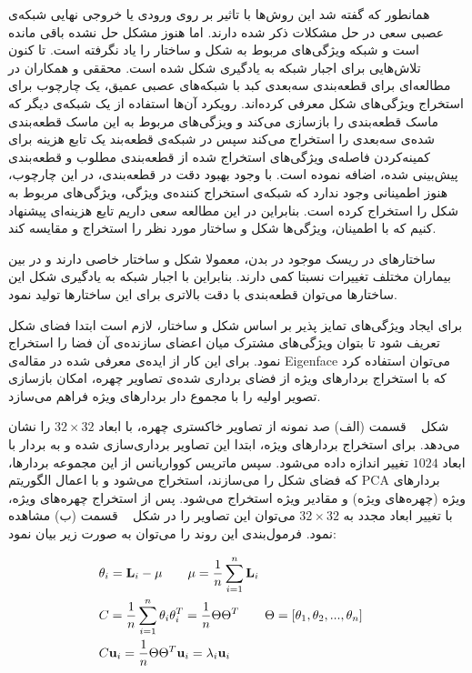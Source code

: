 همانطور که گفته شد این روش‌ها با تاثیر بر روی ورودی یا خروجی نهایی شبکه‌ی عصبی سعی در حل مشکلات ذکر شده دارند. اما هنوز مشکل حل نشده باقی مانده است و شبکه ویژگی‌های مربوط به شکل و ساختار را یاد نگرفته است. تا کنون تلاش‌هایی برای اجبار شبکه به یادگیری شکل شده است. محققی و همکاران  در مطالعه‌ای برای قطعه‌بندی سه‌بعدی کبد با شبکه‌های عصبی عمیق، یک چارچوب برای استخراج ویژگی‌های شکل معرفی کرده‌اند. رویکرد آن‌ها استفاده از یک شبکه‌ی دیگر که ماسک قطعه‌بندی را بازسازی می‌کند و ویزگی‌های مربوط به این ماسک قطعه‌بندی شده‌ی سه‌بعدی را استخراج می‌کند سپس در شبکه‌ی قطعه‌بند یک تابع هزینه برای کمینه‌کردن فاصله‌ی ویژگی‌های استخراج شده از قطعه‌بندی مطلوب و قطعه‌بندی پیش‌بینی شده، اضافه نموده است. با وجود بهبود دقت در قطعه‌بندی، در این چارچوب، هنوز اطمینانی وجود ندارد که شبکه‌ی استخراج کننده‌ی ویژگی، ویژگی‌های مربوط به شکل را استخراج کرده است. بنابراین در این مطالعه سعی داریم تایع هزینه‌ای پیشنهاد کنیم که با اطمینان، ویژگی‌ها شکل و ساختار مورد نظر را استخراج و مقایسه کند.

ساختارهای در ریسک موجود در بدن، معمولا شکل و ساختار خاصی دارند و در بین بیماران مختلف تغییرات نسبتا کمی دارند. بنابراین با اجبار شبکه به یادگیری شکل این ساختارها می‌توان قطعه‌بندی با دقت بالاتری برای این ساختارها تولید نمود. 


برای ایجاد ویژگی‌های تمایز پذیر بر اساس شکل و ساختار، لازم است ابتدا فضای شکل تعریف شود تا بتوان ویژگی‌های مشترک میان اعضای سازنده‌ی آن فضا را استخراج نمود. برای این کار از ایده‌ی معرفی شده در مقاله‌ی Eigenface  می‌توان استفاده کرد که با استخراج بردارهای ویژه از فضای برداری شده‌ی تصاویر چهره، امکان بازسازی تصویر اولیه را با مجموع ‌‌دار بردارهای ویژه فراهم می‌سازد. 

شکل ~ قسمت (الف) صد نمونه از تصاویر خاکستری چهره، با ابعاد $32\times32$ را نشان می‌دهد. برای استخراج بردارهای ویژه، ابتدا این تصاویر برداری‌سازی شده و به بردار با ابعاد $1024$ تغییر اندازه داده می‌شود. سپس ماتریس کوواریانس از این مجموعه بردارها، که فضای شکل  را می‌سازند، استخراج می‌شود و با اعمال الگوریتم PCA    بردارهای ویژه (چهره‌های ویژه) و مقادیر ویژه استخراج می‌شود. پس از استخراج چهره‌های ویژه، با تغییر ابعاد مجدد به $32\times32$ می‌توان این تصاویر را در شکل ~ قسمت (ب) مشاهده نمود. فرمول‌بندی این روند را می‌توان به صورت زیر بیان نمود:

\begin{alignat}{5}
	&\mathbf{\theta}_i =  \mathbf{L}_i - \mathbf{\mu} \qquad  \mathbf{\mu} = \frac{1}{n}\sum_{i=1}^{n} \mathbf{L}_i \notag && \\
	&C = \frac{1}{n}\sum_{i=1}^{n}\mathbf{\theta}_i\mathbf{\theta}_i^{T} = \frac{1}{n}\Theta\Theta^T \qquad   \Theta = [\theta_1, \theta_2, ..., \theta_n]\notag && \\
	&C\mathbf{u}_i = \frac{1}{n}\Theta\Theta^T\mathbf{u}_i=\lambda_i\mathbf{u}_i \label{eigenvecdecomp} &&
\end{alignat}

